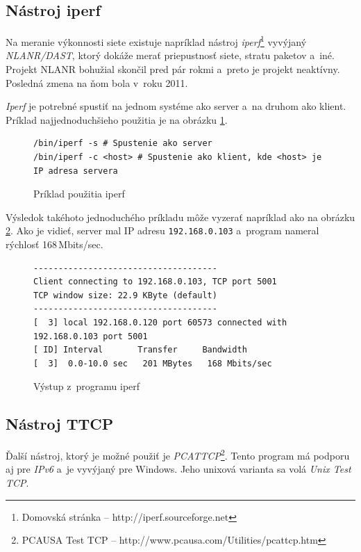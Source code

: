 %
%

\subsection*{Nástroj iperf}

Na meranie výkonnosti siete existuje napríklad nástroj
\emph{iperf}\footnote{Domovská stránka -- http://iperf.sourceforge.net}
vyvýjaný \emph{NLANR/DAST}, ktorý dokáže merať priepustnosť siete, stratu
paketov a~iné.  Projekt NLANR bohužial skončil pred pár rokmi a~preto je
projekt neaktívny.  Posledná zmena na ňom bola v~roku 2011.

\emph{Iperf} je potrebné spustiť na jednom systéme ako server a~na druhom ako
klient. Príklad najjednoduchšieho použitia je na obrázku \ref{alg:iperf-usage}.

\begin{figure}[H]
\begin{lstlisting}
/bin/iperf -s # Spustenie ako server
/bin/iperf -c <host> # Spustenie ako klient, kde <host> je IP adresa servera
\end{lstlisting}
\caption{Príklad použitia iperf}
\label{alg:iperf-usage}
\end{figure}

Výsledok takéhoto jednoduchého príkladu môže vyzerať napríklad ako na obrázku
\ref{alg:iperf-results}. Ako je vidieť, server mal IP adresu
\texttt{192.168.0.103} a~program nameral rýchlosť 168\,Mbits/sec.

\begin{figure}[H]
\begin{lstlisting}
-------------------------------------
Client connecting to 192.168.0.103, TCP port 5001
TCP window size: 22.9 KByte (default)
-------------------------------------
[  3] local 192.168.0.120 port 60573 connected with 192.168.0.103 port 5001
[ ID] Interval       Transfer     Bandwidth
[  3]  0.0-10.0 sec   201 MBytes   168 Mbits/sec
\end{lstlisting}
\caption{Výstup z~programu iperf}
\label{alg:iperf-results}
\end{figure}

%
%

\subsection*{Nástroj TTCP}

Ďalší nástroj, ktorý je možné použiť je \emph{PCATTCP}\footnote{PCAUSA Test TCP
-- http://www.pcausa.com/Utilities/pcattcp.htm}. Tento program má podporu aj
pre \emph{IPv6} a~je vyvýjaný pre Windows. Jeho unixová varianta sa volá
\emph{Unix Test TCP}. 

